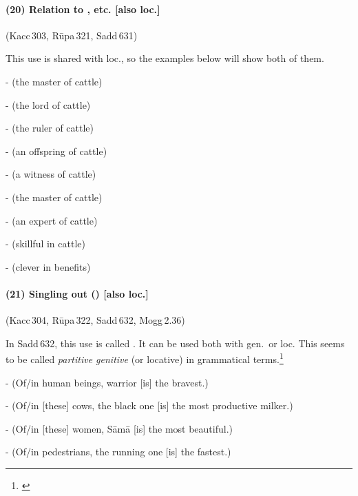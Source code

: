 \paragraph*{(20) Relation to , etc. [also loc.]} (Kacc\,303, R\=upa\,321, Sadd\,631)\par
This use is shared with loc., so the examples below will show both of them.\par
-  (the master of cattle)\par
-  (the lord of cattle)\par
-  (the ruler of cattle)\par
-  (an offspring of cattle)\par
-  (a witness of cattle)\par
-  (the master of cattle)\par
-  (an expert of cattle)\par
-  (skillful in cattle)\par
-  (clever in benefits)\par

\paragraph*{(21) Singling out () [also loc.]} (Kacc\,304, R\=upa\,322, Sadd\,632, Mogg\,2.36)\par
In Sadd\,632, this use is called . It can be used both with gen.\ or loc. This seems to be called \emph{partitive genitive} (or locative) in grammatical terms.\footnote{\citealp[p.~31, 36]{collins:grammar}}\par
-  (Of/in human beings, warrior [is] the bravest.)\par
-  (Of/in [these] cows, the black one [is] the most productive milker.)\par
-  (Of/in [these] women, S\=am\=a [is] the most beautiful.)\par
-  (Of/in pedestrians, the running one [is] the fastest.)\par

